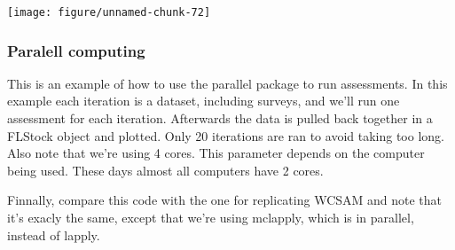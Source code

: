 \documentclass[a4paper,english,10pt]{article}\usepackage[]{graphicx}\usepackage[]{color}
\newenvironment{knitrout}{}{} %
\begin{document}
\begin{knitrout}
\color{fgcolor}

{\centering \texttt{[image: figure/unnamed-chunk-72]} 

}



\end{knitrout}


\subsubsection{Paralell computing}

This is an example of how to use the parallel package to run assessments. In this example each iteration is a dataset, including surveys, and we'll run one assessment for each iteration. Afterwards the data is pulled back together in a FLStock object and plotted. Only 20 iterations are ran to avoid taking too long. Also note that we're using 4 cores. This parameter depends on the computer being used. These days almost all computers have 2 cores.

Finnally, compare this code with the one for replicating WCSAM and note that it's exacly the same, except that we're using mclapply, which is in parallel, instead of lapply. 
\end{document}
